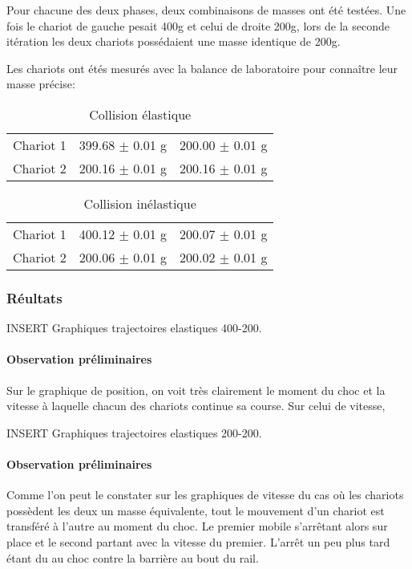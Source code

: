 Pour chacune des deux phases, deux combinaisons de masses ont été testées. Une fois le chariot de gauche pesait 400g et celui de droite 200g, lors de la seconde itération les deux chariots possédaient une masse identique de 200g.

Les chariots ont étés mesurés avec la balance de laboratoire pour connaître leur masse précise:
\begin{table}[h]
    \centering
    \caption{Collision élastique}
    \begin{tabular}{|l|l|l|}
	\hline
	Chariot 1 & 399.68 $\pm$ 0.01 g & 200.00 $\pm$ 0.01 g \\
	Chariot 2 & 200.16 $\pm$ 0.01 g & 200.16 $\pm$ 0.01 g \\
	\hline
    \end{tabular}
\end{table}

\begin{table}[h]
    \centering
    \caption{Collision inélastique}
    \begin{tabular}{|l|l|l|}
	\hline
	Chariot 1 & 400.12 $\pm$ 0.01 g & 200.07 $\pm$ 0.01 g \\
	Chariot 2 & 200.06 $\pm$ 0.01 g & 200.02 $\pm$ 0.01 g \\
	\hline
    \end{tabular}
\end{table}


\subsubsection{Réultats}

INSERT Graphiques trajectoires elastiques 400-200.

\paragraph{Observation préliminaires}
Sur le graphique de position, on voit très clairement le moment du choc et la vitesse à laquelle chacun des chariots continue sa course.
Sur celui de vitesse, 

INSERT Graphiques trajectoires elastiques 200-200.

\paragraph{Observation préliminaires}
Comme l'on peut le constater sur les graphiques de vitesse du cas où les chariots possèdent les deux un masse équivalente, tout le mouvement d'un chariot est transféré à l'autre au moment du choc. Le premier mobile s'arrêtant alors sur place et le second partant avec la vitesse du premier.
L'arrêt un peu plus tard étant du au choc contre la barrière au bout du rail.

